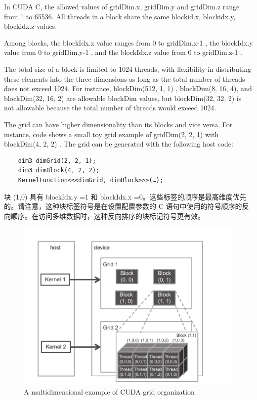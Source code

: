 \documentclass[11pt]{ctexart}
\begin{document}
In CUDA C, the allowed values of gridDim.x, gridDim.y and  gridDim.z range from 1 to 65536. All threads in a block share the same blockid.x, blockidx.y, blockidx.z values.

Among blocks, the blockIdx.x value ranges from 0 to gridDim.x-1 , the blockIdx.y value from 0 to gridDim.y-1 , and the blockIdx.z
value from 0 to gridDim.z-1 .

The total size of a block is limited to 1024 threads, with flexibility in distributing
these elements into the three dimensions as long as the total number of threads does
not exceed 1024. For instance, blockDim(512, 1, 1) , blockDim(8, 16, 4), and
blockDim(32, 16, 2) are allowable blockDim values, but blockDim(32, 32, 2) is
not allowable because the total number of threads would exceed 1024.

The grid can have higher dimensionality than its blocks and vice versa. For
instance, code shows a small toy grid example of gridDim(2, 2, 1) with blockDim(4, 2, 2) . The grid can be generated with the following host code: 

\begin{lstlisting}
	dim3 dimGrid(2, 2, 1);
	dim3 dimBlock(4, 2, 2);
	KernelFunction<<<dimGrid, dimBlock>>>(…);
\end{lstlisting}

块 (1,0) 具有 blockIdx.y =1 和 blockIdx.x =0。这些标签的顺序是最高维度优先的。请注意，这种块标签符号是在设置配置参数的 C 语句中使用的符号顺序的反向顺序。在访问多维数据时，这种反向排序的块标记符号更有效。

\begin{figure}[ht]
	\centering
	\includegraphics[width=1.0\textwidth]{photos/AmultidimensionalexampleofCUDAgridorganization.png}
	\caption{A multidimensional example of CUDA grid organization}
	\label{fig:1}
\end{figure}
\end{document}
